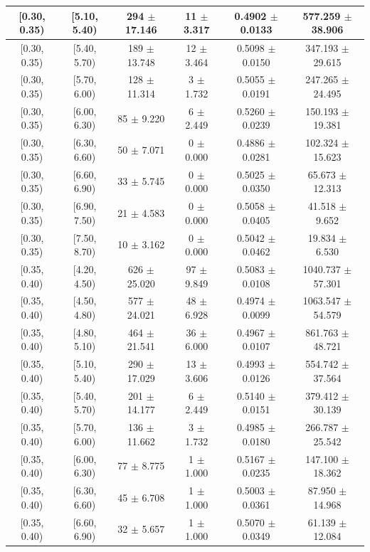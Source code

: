 \begin{longtable}{|c|c|c|c|c|c|}
\hline
[0.30, 0.35) & [5.10, 5.40) & 294 $\pm$ 17.146 & 11 $\pm$ 3.317 & 0.4902 $\pm$ 0.0133 & 577.259 $\pm$ 38.906 \\ 
\hline
[0.30, 0.35) & [5.40, 5.70) & 189 $\pm$ 13.748 & 12 $\pm$ 3.464 & 0.5098 $\pm$ 0.0150 & 347.193 $\pm$ 29.615 \\ 
\hline
[0.30, 0.35) & [5.70, 6.00) & 128 $\pm$ 11.314 & 3 $\pm$ 1.732 & 0.5055 $\pm$ 0.0191 & 247.265 $\pm$ 24.495 \\ 
\hline
[0.30, 0.35) & [6.00, 6.30) & 85 $\pm$ 9.220 & 6 $\pm$ 2.449 & 0.5260 $\pm$ 0.0239 & 150.193 $\pm$ 19.381 \\ 
\hline
[0.30, 0.35) & [6.30, 6.60) & 50 $\pm$ 7.071 & 0 $\pm$ 0.000 & 0.4886 $\pm$ 0.0281 & 102.324 $\pm$ 15.623 \\ 
\hline
[0.30, 0.35) & [6.60, 6.90) & 33 $\pm$ 5.745 & 0 $\pm$ 0.000 & 0.5025 $\pm$ 0.0350 & 65.673 $\pm$ 12.313 \\ 
\hline
[0.30, 0.35) & [6.90, 7.50) & 21 $\pm$ 4.583 & 0 $\pm$ 0.000 & 0.5058 $\pm$ 0.0405 & 41.518 $\pm$ 9.652 \\ 
\hline
[0.30, 0.35) & [7.50, 8.70) & 10 $\pm$ 3.162 & 0 $\pm$ 0.000 & 0.5042 $\pm$ 0.0462 & 19.834 $\pm$ 6.530 \\ 
\hline
[0.35, 0.40) & [4.20, 4.50) & 626 $\pm$ 25.020 & 97 $\pm$ 9.849 & 0.5083 $\pm$ 0.0108 & 1040.737 $\pm$ 57.301 \\ 
\hline
[0.35, 0.40) & [4.50, 4.80) & 577 $\pm$ 24.021 & 48 $\pm$ 6.928 & 0.4974 $\pm$ 0.0099 & 1063.547 $\pm$ 54.579 \\ 
\hline
[0.35, 0.40) & [4.80, 5.10) & 464 $\pm$ 21.541 & 36 $\pm$ 6.000 & 0.4967 $\pm$ 0.0107 & 861.763 $\pm$ 48.721 \\ 
\hline
[0.35, 0.40) & [5.10, 5.40) & 290 $\pm$ 17.029 & 13 $\pm$ 3.606 & 0.4993 $\pm$ 0.0126 & 554.742 $\pm$ 37.564 \\ 
\hline
[0.35, 0.40) & [5.40, 5.70) & 201 $\pm$ 14.177 & 6 $\pm$ 2.449 & 0.5140 $\pm$ 0.0151 & 379.412 $\pm$ 30.139 \\ 
\hline
[0.35, 0.40) & [5.70, 6.00) & 136 $\pm$ 11.662 & 3 $\pm$ 1.732 & 0.4985 $\pm$ 0.0180 & 266.787 $\pm$ 25.542 \\ 
\hline
[0.35, 0.40) & [6.00, 6.30) & 77 $\pm$ 8.775 & 1 $\pm$ 1.000 & 0.5167 $\pm$ 0.0235 & 147.100 $\pm$ 18.362 \\ 
\hline
[0.35, 0.40) & [6.30, 6.60) & 45 $\pm$ 6.708 & 1 $\pm$ 1.000 & 0.5003 $\pm$ 0.0361 & 87.950 $\pm$ 14.968 \\ 
\hline
[0.35, 0.40) & [6.60, 6.90) & 32 $\pm$ 5.657 & 1 $\pm$ 1.000 & 0.5070 $\pm$ 0.0349 & 61.139 $\pm$ 12.084 \\ 

\end{longtable}

